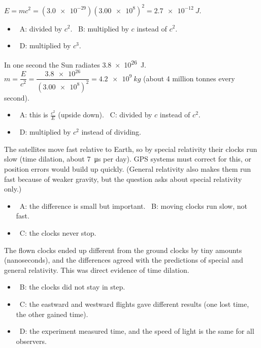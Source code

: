 \documentclass[12pt]{article}
\begin{document}
\begin{practiceanswers}
\begin{practiceans}
  $E = mc^2 = (\num{3.0e-29})(\num{3.00e8})^2 = \qty{2.7e-12}{J}$.
  \begin{itemize}
    \item \xmark\ A: divided by $c^2$. \quad \xmark\ B: multiplied by $c$ instead of $c^2$.
    \item \xmark\ D: multiplied by $c^3$.
  \end{itemize}
\end{practiceans}

\begin{practiceans}
  In one second the Sun radiates \qty{3.8e26}{J}. $m = \dfrac{E}{c^2} = \dfrac{\num{3.8e26}}{(\num{3.00e8})^2}
  = \qty{4.2e9}{kg}$ (about 4 million tonnes every second).
  \begin{itemize}
    \item \xmark\ A: this is $\frac{c^2}{E}$ (upside down). \quad \xmark\ C: divided by $c$ instead of
          $c^2$.
    \item \xmark\ D: multiplied by $c^2$ instead of dividing.
  \end{itemize}
\end{practiceans}

\begin{practiceans}
  The satellites move fast relative to Earth, so by special relativity their clocks run slow (time
  dilation, about \qty{7}{\micro s} per day). GPS systems must correct for this, or position errors would
  build up quickly. (General relativity also makes them run fast because of weaker gravity, but the
  question asks about special relativity only.)
  \begin{itemize}
    \item \xmark\ A: the difference is small but important. \quad \xmark\ B: moving clocks run slow,
          not fast.
    \item \xmark\ C: the clocks never stop.
  \end{itemize}
\end{practiceans}

\begin{practiceans}
  The flown clocks ended up different from the ground clocks by tiny amounts (nanoseconds), and the
  differences agreed with the predictions of special and general relativity. This was direct evidence
  of time dilation.
  \begin{itemize}
    \item \xmark\ B: the clocks did not stay in step.
    \item \xmark\ C: the eastward and westward flights gave different results (one lost time, the other
          gained time).
    \item \xmark\ D: the experiment measured time, and the speed of light is the same for all observers.
  \end{itemize}
\end{practiceans}


\end{practiceanswers}
\end{document}
